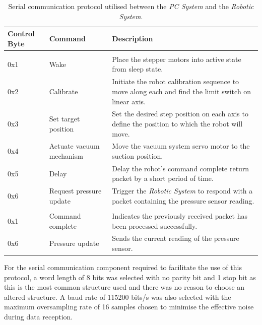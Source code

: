 \begin{table}[!ht]
	\renewcommand{\arraystretch}{1.3}
	\centering
	\begin{tabular}{|>{\raggedright}m{1.5cm}|>{\raggedright}m{3cm}|>{\raggedright\arraybackslash}m{10cm}|}
		\hline
		\textbf{Control Byte} & \textbf{Command} & \textbf{Description} \\
		\hline
		\multicolumn{3}{|l|}{\textbf{\textit{PC System} to \textit{Robotic System}}} \\
		\hline
		0x1 & Wake & Place the stepper motors into active state from sleep state. \\
		\hline
		0x2 & Calibrate & Initiate the robot calibration sequence to move along each and find the limit switch on linear axis. \\
		\hline
		0x3 & Set target position & Set the desired step position on each axis to define the position to which the robot will move. \\
		\hline
		0x4 & Actuate vacuum mechanism & Move the vacuum system servo motor to the suction position. \\
		\hline
		0x5 & Delay & Delay the robot's command complete return packet by a short period of time. \\
		\hline
		0x6 & Request pressure update & Trigger the \textit{Robotic System} to respond with a packet containing the pressure sensor reading. \\
		\hline
		\multicolumn{3}{|l|}{\textbf{\textit{Robotic System} to \textit{PC System}}} \\
		\hline
		0x1 & Command complete & Indicates the previously received packet has been processed successfully. \\
		\hline
		0x6 & Pressure update & Sends the current reading of the pressure sensor. \\
		\hline
	\end{tabular}
	\caption{\label{tab:serial-communication-protocol}Serial communication protocol utilised between the \textit{PC System} and the \textit{Robotic System}.}
\end{table}

For the serial communication component required to facilitate the use of this protocol, a word length of 8 bits was selected with no parity bit and 1 stop bit as this is the most common structure used and there was no reason to choose an altered structure. A baud rate of 115200 bits/s was also selected with the maximum oversampling rate of 16 samples chosen to minimise the effective noise during data reception. 


